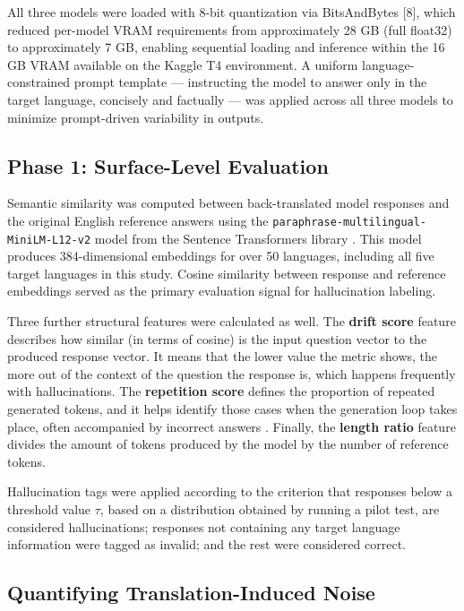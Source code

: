 \documentclass[conference]{IEEEtran}
\begin{document}
All three models were loaded with 8-bit quantization via
BitsAndBytes [8], which reduced per-model VRAM requirements from approximately 28 GB (full float32) to approximately 7 GB, enabling sequential loading and inference within
the 16 GB VRAM available on the Kaggle T4 environment. A
uniform language-constrained prompt template — instructing
the model to answer only in the target language, concisely and
factually — was applied across all three models to minimize
prompt-driven variability in outputs.

\subsection{Phase 1: Surface-Level Evaluation}

Semantic similarity was computed between
back-translated model responses and the original English reference answers using the \texttt{paraphrase-multilingual-MiniLM-L12-v2} model
from the Sentence Transformers library \cite{b4}. This model produces 384-dimensional embeddings for over 50 languages,
including all five target languages in this study. Cosine
similarity between response and reference embeddings served
as the primary evaluation signal for hallucination labeling.

Three further structural features were calculated as well.
The \textbf{drift score} feature describes how similar (in terms of cosine)
is the input question vector to the produced response
vector. It means that the lower value the metric shows, the
more out of the context of the question the response is,
which happens frequently with hallucinations. The \textbf{repetition score} defines the proportion of repeated generated tokens,
and it helps identify those cases when the generation loop
takes place, often accompanied by incorrect answers \cite{b19}.
Finally, the \textbf{length ratio} feature divides the amount of tokens
produced by the model by the number of reference tokens.

Hallucination tags were applied according to the criterion that responses below a threshold value $\tau$, based on a distribution obtained by running a pilot test, are considered hallucinations; responses not containing any target language information were tagged as invalid; and the rest were considered correct.

\subsection{Quantifying Translation-Induced Noise}
\end{document}
